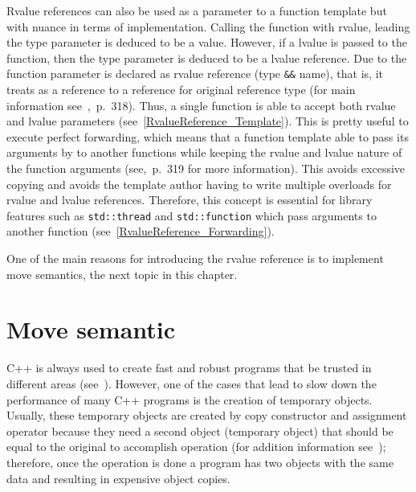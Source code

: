 \documentclass[11pt]{report}
\begin{document}
Rvalue references can also be used as a parameter to a function template but with nuance in terms of implementation. Calling the function with rvalue, leading the type parameter is deduced to be a value. However, if a lvalue is passed to the function, then the type parameter is deduced to be a lvalue reference. Due to the function parameter is declared as rvalue reference (type \texttt{\&\&} name), that is, it treats as a reference to a reference for original reference type (for main information see~\cite{Williams:2012:CCA},~p.~318). Thus, a single function is able to accept both rvalue and lvalue parameters (see~\ref{RvalueReference_Template}). This is pretty useful to execute perfect forwarding, which means that a function template able to pass its arguments by to another functions while keeping the rvalue and lvalue nature of the function arguments (see\cite{Williams:2012:CCA},~p.~319 for more information). This avoids excessive copying and avoids the template author having to write multiple overloads for rvalue and lvalue references. Therefore, this concept is essential for library features such as \texttt{std::thread} and \texttt{std::function} which pass arguments to another function (see~\ref{RvalueReference_Forwarding}).

One of the main reasons for introducing the rvalue reference is to implement move semantics, the next topic in this chapter.

\section{Move semantic}
\label{section: Move semantic}
C++ is always used to create fast and robust programs that be trusted in different areas (see~\cite{Stroustrup:2012:Cpp11}). However, one of the cases that lead to slow down the performance of many C++ programs is the creation of temporary objects. Usually, these temporary objects are created by copy constructor and assignment operator because they need a second object (temporary object) that should be equal to the original to accomplish operation (for addition information see~\cite{Stroustrup:2012:Cpp11}); therefore, once the operation is done a program has two objects with the same data and resulting in expensive object copies.
\end{document}
